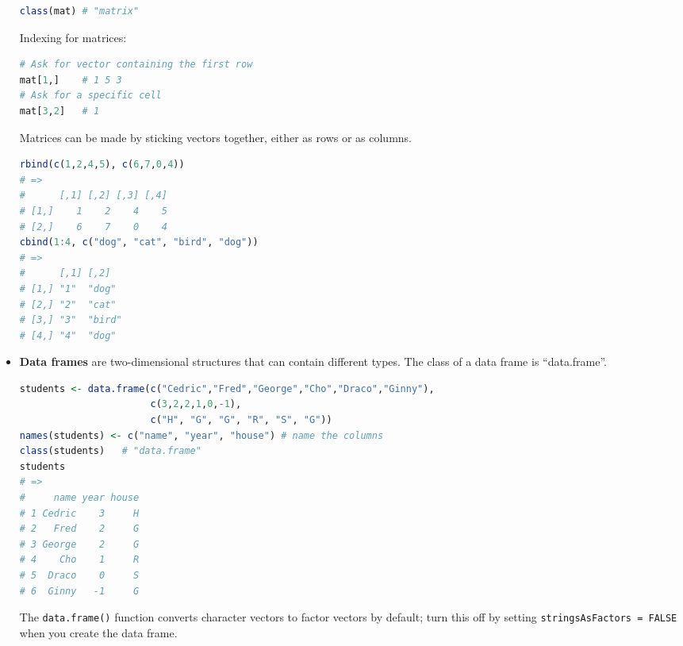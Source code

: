 \begin{itemize}
\begin{lstlisting}[language={r}, style=snippet]
class(mat) # "matrix"
\end{lstlisting}
Indexing for matrices:
\begin{lstlisting}[language={r}, style=snippet]
# Ask for vector containing the first row
mat[1,]    # 1 5 3
# Ask for a specific cell
mat[3,2]   # 1
\end{lstlisting}
Matrices can be made by sticking vectors together, either as rows or as columns.
\begin{lstlisting}[language={r}, style=snippet]
rbind(c(1,2,4,5), c(6,7,0,4))
# =>
#      [,1] [,2] [,3] [,4]
# [1,]    1    2    4    5
# [2,]    6    7    0    4
cbind(1:4, c("dog", "cat", "bird", "dog"))
# =>
#      [,1] [,2]
# [1,] "1"  "dog"
# [2,] "2"  "cat"
# [3,] "3"  "bird"
# [4,] "4"  "dog"
\end{lstlisting}
\item \textbf{Data frames} are two-dimensional structures that can contain different types. The class of a data frame is ``data.frame''.
\begin{lstlisting}[language={r}, style=snippet]
students <- data.frame(c("Cedric","Fred","George","Cho","Draco","Ginny"),
                       c(3,2,2,1,0,-1),
                       c("H", "G", "G", "R", "S", "G"))
names(students) <- c("name", "year", "house") # name the columns
class(students)   # "data.frame"
students
# =>
#     name year house
# 1 Cedric    3     H
# 2   Fred    2     G
# 3 George    2     G
# 4    Cho    1     R
# 5  Draco    0     S
# 6  Ginny   -1     G
\end{lstlisting}
The \texttt{data.frame()} function converts character vectors to factor vectors by default; turn this off by setting \texttt{stringsAsFactors = FALSE} when you create the data frame.


\end{itemize}
